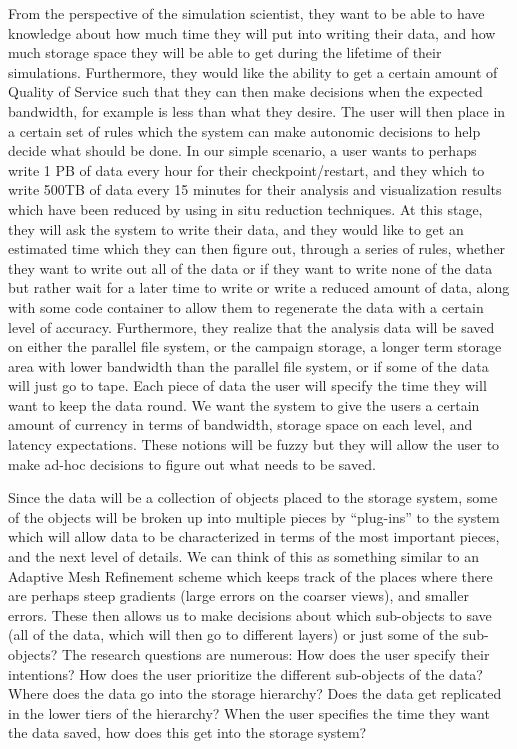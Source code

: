 From the perspective of the simulation scientist, they want to be able to
have knowledge about how much time they will put into writing their data,
and how much storage space they will be able to get during the lifetime of
their simulations. Furthermore, they would like the ability to get a certain
amount of Quality of Service such that they can then make decisions when the
expected bandwidth, for example is less than what they desire. The user will
then place in a certain set of rules which the system can make autonomic
decisions to help decide what should be done. In our simple scenario, a user
wants to perhaps write 1 PB of data every hour for their checkpoint/restart,
and they which to write 500TB of data every 15 minutes for their analysis
and visualization results which have been reduced by using in situ reduction
techniques. At this stage, they will ask the system to write their data, and
they would like to get an estimated time which they can then figure out,
through a series of rules, whether they want to write out all of the data or
if they want to write none of the data but rather wait for a later time to
write or write a reduced amount of data, along with some code container to
allow them to regenerate the data with a certain level of accuracy.
Furthermore, they realize that the analysis data will be saved on either the
parallel file system, or the campaign storage, a longer term storage area
with lower bandwidth than the parallel file system, or if some of the data
will just go to tape. Each piece of data the user will specify the time they
will want to keep the data round. We want the system to give the users a
certain amount of currency in terms of bandwidth, storage space on each
level, and latency expectations. These notions will be fuzzy but they will
allow the user to make ad-hoc decisions to figure out what needs to be
saved.

Since the data will be a collection of objects placed to the storage system,
some of the objects will be broken up into multiple pieces by ``plug-ins''
to the system which will allow data to be characterized in terms of the most
important pieces, and the next level of details. We can think of this as
something similar to an Adaptive Mesh Refinement scheme which keeps track of
the places where there are perhaps steep gradients (large errors on the
coarser views), and smaller errors. These then allows us to make decisions
about which sub-objects to save (all of the data, which will then go to
different layers) or just some of the sub-objects? The research questions
are numerous: How does the user specify their intentions? How does the user
prioritize the different sub-objects of the data? Where does the data go
into the storage hierarchy? Does the data get replicated in the lower tiers
of the hierarchy? When the user specifies the time they want the data saved,
how does this get into the storage system?

